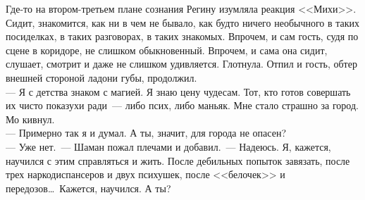Где-то на втором-третьем плане сознания Регину изумляла реакция <<Михи>>. 
Сидит, знакомится, как ни в чем не бывало, как будто ничего необычного в таких 
посиделках, в таких разговорах, в таких знакомых. Впрочем, и сам гость, судя по 
сцене в коридоре, не слишком обыкновенный. Впрочем, и сама она сидит, слушает, 
смотрит и даже не слишком удивляется. Глотнула. Отпил и гость, обтер внешней 
стороной ладони губы, продолжил.\\
--- Я с детства знаком с магией. Я знаю цену чудесам. Тот, кто готов совершать их 
чисто показухи ради~--- либо псих, либо маньяк. Мне стало страшно за город.\\
Мо кивнул.\\
--- Примерно так я и думал. А ты, значит, для города не опасен?\\
--- Уже нет.~--- Шаман пожал плечами и добавил.~--- Надеюсь. Я, кажется, научился 
с этим справляться и жить. После дебильных попыток завязать, после трех 
наркодиспансеров и двух психушек, после <<белочек>> и передозов\ldots\ Кажется, 
научился. А ты?

